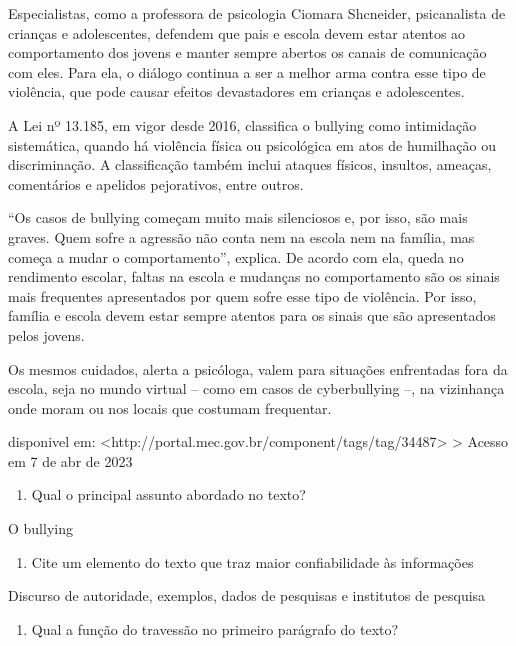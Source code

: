 {Especialistas, como a professora de psicologia Ciomara Shcneider,
psicanalista de crianças e adolescentes, defendem que pais e escola
devem estar atentos ao comportamento dos jovens e manter sempre abertos
os canais de comunicação com eles. Para ela, o diálogo continua a ser a
melhor arma contra esse tipo de violência, que pode causar efeitos
devastadores em crianças e adolescentes.

A Lei nº 13.185, em vigor desde 2016, classifica o bullying como
intimidação sistemática, quando há violência física ou psicológica em
atos de humilhação ou discriminação. A classificação também inclui
ataques físicos, insultos, ameaças, comentários e apelidos pejorativos,
entre outros.

``Os casos de bullying começam muito mais silenciosos e, por isso, são
mais graves. Quem sofre a agressão não conta nem na escola nem na
família, mas começa a mudar o comportamento'', explica. De acordo com
ela, queda no rendimento escolar, faltas na escola e mudanças no
comportamento são os sinais mais frequentes apresentados por quem sofre
esse tipo de violência. Por isso, família e escola devem estar sempre
atentos para os sinais que são apresentados pelos jovens.

Os mesmos cuidados, alerta a psicóloga, valem para situações enfrentadas
fora da escola, seja no mundo virtual -- como em casos de cyberbullying
--, na vizinhança onde moram ou nos locais que costumam frequentar.

disponivel em:
\textless http://portal.mec.gov.br/component/tags/tag/34487\textgreater{}
\textgreater{} Acesso em 7 de abr de 2023

\begin{enumerate}
\def\labelenumi{\arabic{enumi})}
\tightlist
\item
  Qual o principal assunto abordado no texto?
\end{enumerate}

O bullying

\begin{enumerate}
\def\labelenumi{\arabic{enumi})}
\setcounter{enumi}{1}
\tightlist
\item
  Cite um elemento do texto que traz maior confiabilidade às informações
\end{enumerate}

Discurso de autoridade, exemplos, dados de pesquisas e institutos de
pesquisa

\begin{enumerate}
\def\labelenumi{\arabic{enumi})}
\setcounter{enumi}{2}
\tightlist
\item
  Qual a função do travessão no primeiro parágrafo do texto?
\end{enumerate}

}
